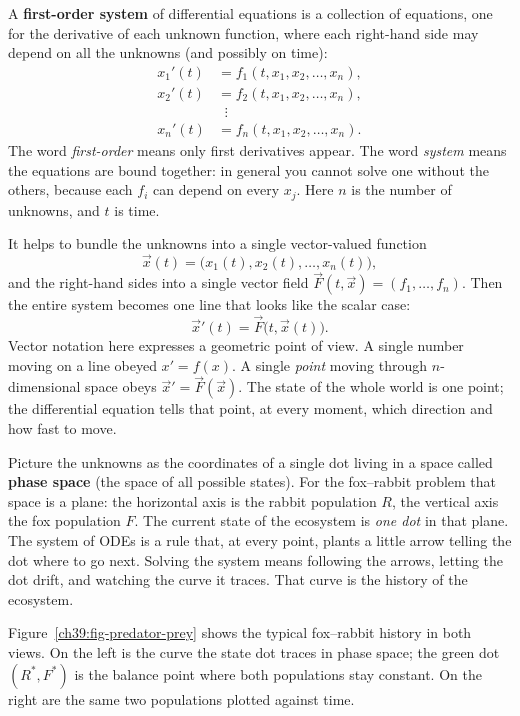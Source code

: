 A \textbf{first-order system} of differential equations is a collection of
equations, one for the derivative of each unknown function, where each
right-hand side may depend on all the unknowns (and possibly on time):
\[
  \begin{aligned}
    x_1'(t) &= f_1(t, x_1, x_2, \dots, x_n),\\
    x_2'(t) &= f_2(t, x_1, x_2, \dots, x_n),\\
            &\;\;\vdots\\
    x_n'(t) &= f_n(t, x_1, x_2, \dots, x_n).
  \end{aligned}
\]
The word \emph{first-order} means only first derivatives appear. The word
\emph{system} means the equations are bound together: in general you cannot
solve one without the others, because each $f_i$ can depend on every $x_j$.
Here $n$ is the number of unknowns, and $t$ is time.

It helps to bundle the unknowns into a single vector-valued
function
\[
  \vec{x}(t) = \big(x_1(t), x_2(t), \dots, x_n(t)\big),
\]
and the right-hand sides into a single vector field
$\vec{F}(t,\vec x) = (f_1, \dots, f_n)$. Then the entire system becomes one
line that looks like the scalar case:
\[
  \boxed{\;\vec{x}'(t) = \vec{F}\big(t, \vec{x}(t)\big).\;}
\]
Vector notation here expresses a geometric point of view. A single number
moving on a line obeyed $x' = f(x)$. A single \emph{point} moving through
$n$-dimensional space obeys $\vec x' = \vec F(\vec x)$. The state of the whole
world is one point; the differential equation tells that point, at every moment,
which direction and how fast to move.

\begin{intuitionbox}
Picture the unknowns as the coordinates of a single dot living in a space called
\textbf{phase space} (the space of all possible states). For the fox--rabbit
problem that space is a plane: the horizontal axis is the rabbit population
$R$, the vertical axis the fox population $F$.
The current state of the ecosystem is \emph{one dot} in that plane. The system of
ODEs is a rule that, at every point, plants a little arrow telling the dot where to
go next. Solving the system means following the arrows,
letting the dot drift, and watching the curve it traces. That curve is the
history of the ecosystem.
\end{intuitionbox}

Figure~\ref{ch39:fig-predator-prey} shows the typical fox--rabbit history in
both views. On the left is the curve the state dot traces in phase space; the
green dot $(R^*, F^*)$ is the balance point where both populations stay
constant. On the right are the same two populations plotted against time.

